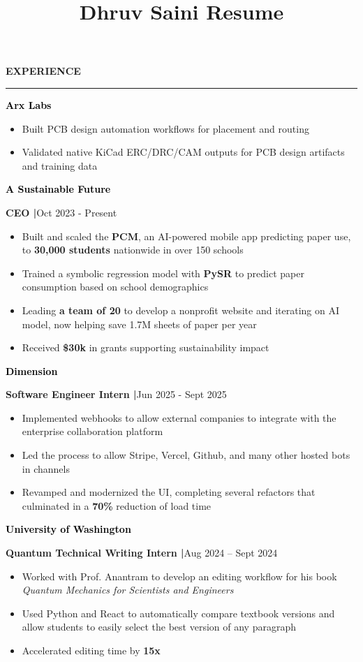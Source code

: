 \documentclass[8pt,a4paper]{altacv}
\title{Dhruv Saini Resume}
\makeatletter
\newcommand{\resumebodysize}{\fontsize{8pt}{9pt}\selectfont}
\renewcommand{\divider}{\textcolor{body!30}{\hdashrule{\linewidth}{0.6pt}{0.285em}}\vspace{4.096pt}}
\renewcommand{\makecvheader}{%
  \begingroup
    \raggedright\color{emphasis}%
    {\Huge\bfseries\MakeUppercase{\@name}\par}
    \vspace{4.3pt}
    {\small\bfseries\@personalinfo\par}
  \endgroup
}
\renewcommand{\cvsection}[2][]{%
  \bigskip%
  \vspace{3.686pt}%
  \ifstrequal{#1}{}{}{\marginpar{\vspace*{\dimexpr1pt-\baselineskip}\raggedright}}%
  {\color{heading}\large\bfseries\MakeUppercase{#2}}\\[-1ex]\vspace{1.489pt}%
  {\color{heading}\rule{\linewidth}{2pt}\par}\medskip\vspace{1.179pt}
}
\renewcommand{\cvevent}[4]{%
  {\fontsize{9pt}{9pt}\selectfont\color{black}\hspace*{-0.282pt}#1\par}
  \ifstrequal{#2}{}{}{%
    \vspace{2.144pt}
    {\fontsize{9pt}{9pt}\selectfont\textbf{\color{accent}#2}\hspace{0.5em}\resumebodysize\faCalendar\hspace{0.5em}#3\par}%
  }%
  \vspace{2.145pt}\resumebodysize
}
\makeatother
\begin{document}
\makecvheader
\vskip0.917pt
\resumebodysize

\cvsection{Experience}
\vskip0.464pt

\cvevent{\textcolor{black}{\textbf{Arx Labs}}}{}{}{}
\begin{itemize}
\item Built PCB design automation workflows for placement and routing
\item Validated native KiCad ERC/DRC/CAM outputs for PCB design artifacts and training data
\end{itemize}
\divider

\cvevent{\textcolor{black}{\textbf{A Sustainable Future}}}{\textnormal{CEO |}}{Oct 2023 - Present}{}
\begin{itemize}
\item Built and scaled the \textbf{PCM}, an AI-powered mobile app predicting paper use, to \textbf{30,000 students} nationwide in over 150 schools
\item Trained a symbolic regression model with \textbf{PySR} to predict paper consumption based on school demographics
\item Leading \textbf{a team of 20} to develop a nonprofit website and iterating on AI model, now helping save 1.7M sheets of paper per year
\item Received \textbf{\$30k} in grants supporting sustainability impact
\end{itemize}
\divider

\cvevent{\textcolor{black}{\textbf{Dimension}}}{\textnormal{Software Engineer Intern |}}{Jun 2025 - Sept 2025}{}
\begin{itemize}
\item Implemented webhooks to allow external companies to integrate with the enterprise collaboration platform
\item Led the process to allow Stripe, Vercel, Github, and many other hosted bots in channels
\item Revamped and modernized the UI, completing several refactors that culminated in a \textbf{70\%} reduction of load time
\end{itemize}
\divider

\cvevent{\textcolor{black}{\textbf{University of Washington}}}{\textnormal{Quantum Technical Writing Intern |}}{Aug 2024 – Sept 2024}{}
\begin{itemize}
\item Worked with Prof. Anantram to develop an editing workflow for his book \textit{Quantum Mechanics for Scientists and Engineers}
\item Used Python and React to automatically compare textbook versions and allow students to easily select the best version of any paragraph
\item Accelerated editing time by \textbf{15x}
\end{itemize}
\end{document}

